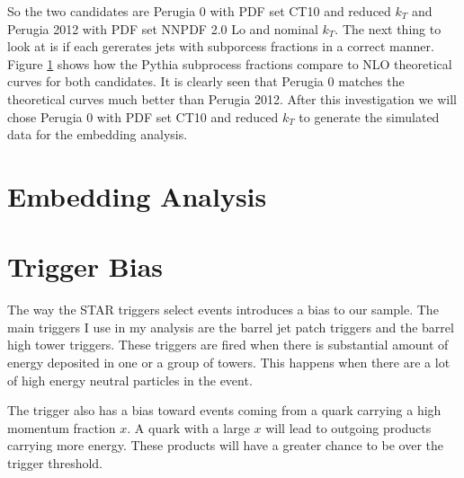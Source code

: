 \documentclass[abstract = on,listof=totoc, bibliography=totoc]{scrreprt}
\begin{document}
So the two candidates are Perugia 0 with PDF set CT10 and reduced $k_T$ and Perugia 2012 with PDF set NNPDF 2.0 Lo and nominal $k_T$.  The next thing to look at is if each gererates jets with subporcess fractions in a correct manner. Figure \ref{fig:jetSubprocessFractions} shows how the Pythia subprocess fractions compare to NLO theoretical curves for both candidates. It is clearly seen that Perugia 0 matches the theoretical curves much better than Perugia 2012. After this investigation we will chose Perugia 0 with PDF set CT10 and reduced $k_T$ to generate the simulated data for the embedding analysis. 

\begin{figure}
\caption[]{}
\label{fig:jetSubprocessFractions}
\end{figure}

\chapter{Embedding Analysis}



\chapter{Trigger Bias}

The way the STAR triggers select events introduces a bias to our sample. The main triggers I use in my analysis are the barrel jet patch triggers and the barrel high tower triggers. These triggers are fired when there is substantial amount of energy deposited in one or a group of towers. This happens when there are a lot of high energy neutral particles in the event. 



The trigger also has a bias toward events coming from a quark carrying a high momentum fraction $x$. A quark with a large $x$ will lead to outgoing products carrying more energy. These products will have a greater chance to be over the trigger threshold.   
\end{document}
